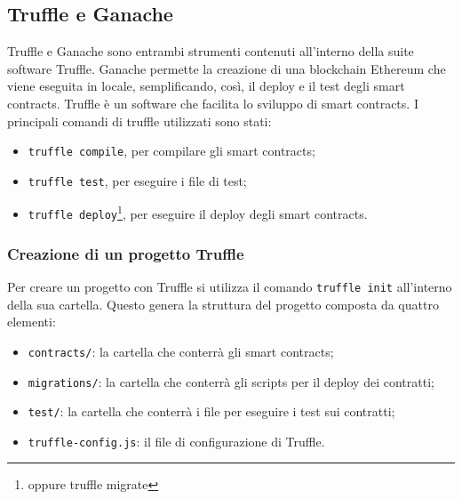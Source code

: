 \documentclass[a4paper]{article}
\begin{document}
        \subsection{Truffle e Ganache}
        Truffle e Ganache sono entrambi strumenti contenuti all'interno della suite software Truffle.
        Ganache permette la creazione di una blockchain Ethereum che viene eseguita in locale, semplificando, così,
        il deploy e il test degli smart contracts. Truffle è un software che facilita lo sviluppo di smart contracts.
        \newline
        I principali comandi di truffle utilizzati sono stati:
        \begin{itemize}
          \item \verb|truffle compile|, per compilare gli smart contracts;
          \item \verb|truffle test|, per eseguire i file di test;
          \item \verb|truffle deploy|\footnote{oppure truffle migrate}, per eseguire il deploy degli smart contracts\cite{truffle}.
        \end{itemize}
        \subsubsection{Creazione di un progetto Truffle}
        Per creare un progetto con Truffle si utilizza il comando \verb|truffle init| all'interno della sua cartella. Questo genera la struttura del progetto composta da quattro elementi:
        \begin{itemize}
          \item \verb|contracts/|: la cartella che conterrà gli smart contracts;
          \item \verb|migrations/|: la cartella che conterrà gli scripts per il deploy dei contratti;
          \item \verb|test/|: la cartella che conterrà i file per eseguire i test sui contratti;
          \item \verb|truffle-config.js|: il file di configurazione di Truffle.
        \end{itemize}
\end{document}
